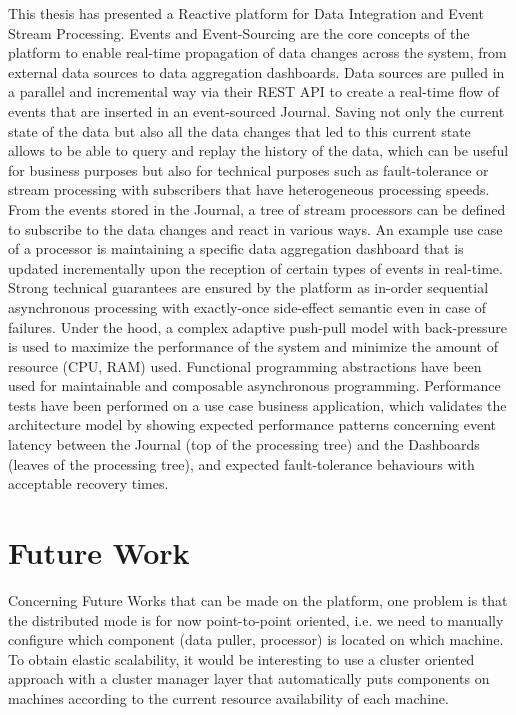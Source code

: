 This thesis has presented a Reactive platform for Data Integration and Event Stream Processing. Events and Event-Sourcing are the core concepts of the platform to enable 
real-time propagation of data changes across the system, from external data sources to data aggregation dashboards. Data sources are pulled in a parallel and incremental way via their REST API to create a real-time flow of events that are inserted in an event-sourced Journal. Saving not only the current state of the data but also all the data changes
that led to this current state allows to be able to query and replay the history of the data, which can be useful for business purposes but also for technical purposes such as fault-tolerance or stream processing with subscribers that have heterogeneous processing speeds.
From the events stored in the Journal, a tree of stream processors can be defined to subscribe to the data changes and react in various ways. An example use case of a processor is maintaining a specific data aggregation dashboard that is updated incrementally upon the reception of certain types of events in real-time. Strong technical guarantees are ensured by the platform as in-order sequential asynchronous processing with exactly-once side-effect semantic even in case of failures. Under the hood, a complex adaptive push-pull model with back-pressure is used to maximize the performance of the system and minimize the amount of resource (CPU, RAM) used. Functional programming abstractions have been used for maintainable and composable asynchronous programming.
Performance tests have been performed on a use case business application, which validates the architecture model by showing expected performance patterns concerning event latency between the Journal (top of the processing tree) and the Dashboards (leaves of the processing tree), and expected fault-tolerance behaviours with acceptable recovery times.


\section{Future Work}

Concerning Future Works that can be made on the platform, one problem is that the distributed mode is for now point-to-point oriented, i.e. we need to manually configure which component (data puller, processor) is located on which machine. To obtain elastic scalability, it would be interesting to use a cluster oriented approach with a cluster manager layer that automatically puts components on machines according to the current resource availability of each machine.
\\

